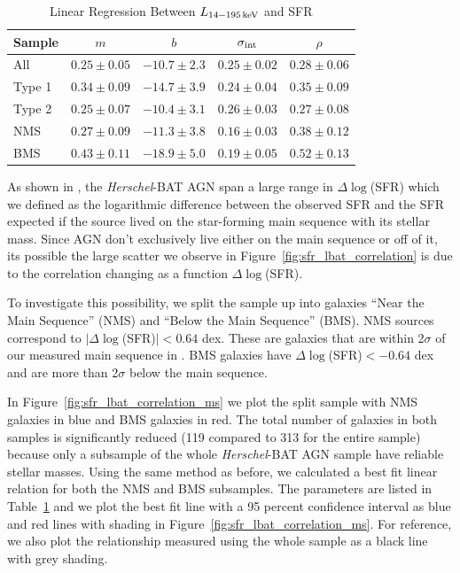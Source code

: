 \documentclass[fleqn, usenatbib]{mnras}
\newcommand{\herschel}{\emph{Herschel}}
\begin{document}
\begin{table}
\begin{threeparttable}
\captionsetup{font=small,labelfont=bf,labelsep=period}
\caption{Linear Regression Between $L_{\rm14-195\,keV}$ and SFR \label{tab:lbat_sfr_correlation}}
\begin{tabular}{lcccc}
\toprule 
 Sample & $m$ & $b$  & $\sigma_{\rm int}$ & $\rho$  \\
\midrule
All        & $0.25\pm0.05$ & $-10.7\pm2.3$ & $0.25\pm0.02$ & $0.28\pm0.06$ \\
Type 1 &  $0.34\pm0.09$ & $-14.7\pm3.9$ & $0.24\pm0.04$ & $0.35\pm0.09$ \\ 
Type 2 &  $0.25\pm0.07$ & $-10.4\pm3.1$ & $0.26\pm0.03$ & $0.27\pm0.08$ \\
NMS      & $0.27\pm0.09$ & $-11.3\pm3.8$ & $0.16\pm0.03$ & $0.38\pm0.12$\\
BMS   & $0.43\pm0.11$ & $-18.9\pm5.0$ & $0.19\pm0.05$ & $0.52\pm0.13$ \\
\bottomrule
\end{tabular}
\end{threeparttable}
\end{table}

As shown in \citet{Shimizu:2015xo}, the \herschel-BAT AGN span a large range in $\Delta\log$(SFR) which we defined as the logarithmic difference between the observed SFR and the SFR expected if the source lived on the star-forming main sequence with its stellar mass. Since AGN don't exclusively live either on the main sequence or off of it, its possible the large scatter we observe in Figure~\ref{fig:sfr_lbat_correlation} is due to the correlation changing as a function $\Delta\log$(SFR). 

To investigate this possibility, we split the sample up into galaxies ``Near the Main Sequence'' (NMS) and ``Below the Main Sequence'' (BMS). NMS sources correspond to $|\Delta\log$(SFR)$|< 0.64$ dex. These are galaxies that are within 2$\sigma$ of our measured main sequence in \citet{Shimizu:2015xo}. BMS galaxies have $\Delta\log$(SFR)$< -0.64$ dex and are more than 2$\sigma$ below the main sequence. 

In Figure~\ref{fig:sfr_lbat_correlation_ms} we plot the split sample with NMS galaxies in blue and BMS galaxies in red. The total number of galaxies in both samples is significantly reduced (119 compared to 313 for the entire sample) because only a subsample of the whole \herschel-BAT AGN sample have reliable stellar masses. Using the same method as before, we calculated a best fit linear relation for both the NMS and BMS subsamples. The parameters are listed in Table~\ref{tab:lbat_sfr_correlation} and we plot the best fit line with a 95 percent confidence interval as blue and red lines with shading in Figure~\ref{fig:sfr_lbat_correlation_ms}. For reference, we also plot the relationship measured using the whole sample as a black line with grey shading. 
\end{document}
